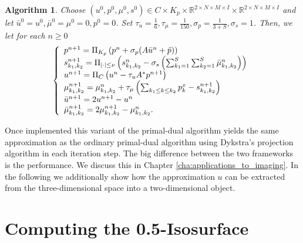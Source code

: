 \documentclass[abstracton]{scrreprt}
\newtheorem{algorithm}[theorem]{Algorithm}
\begin{document}
            \begin{algorithm}
                \label{alg:mumford_shah_lagrange_multiplier}
                Choose $(u^{0}, p^{0}, \mu^{0}, s^{0}) \in C \times K_{p} \times \mathbb{R}^{2 \times N \times M \times I} \times \mathbb{R}^{2 \times N \times M \times I}$ and let $\bar{u}^{0} = u^{0}, \bar{\mu}^{0} = \mu^{0} = 0, p^{0} = 0$. Set $\tau_{u} = \frac{1}{6}, \tau_{\mu} = \frac{1}{150}, \sigma_{p} = \frac{1}{3 + S}, \sigma_{s} = 1$. Then, we let for each $n \ge 0$
                    \begin{equation}
                        \left\{ 
                            \begin{array}{l l}
                              p^{n+1} = \Pi_{K_{p}} \left(p^{n} + \sigma_{p} (A \bar{u}^{n} + \tilde{p})\right) \\
                              s_{k_{1}, k_{2}}^{n+1} = \Pi_{|\cdot| \le \nu} \left(s_{k_{1}, k_{2}}^{n} - \sigma_{s} \left( \sum_{k_{1} = 1}^{S} \sum_{k_{2} = 1}^{S} \bar{\mu}_{k_{1}, k_{2}}^{n} \right) \right) \\
                              u^{n+1} = \Pi_{C} \left(u^{n} - \tau_{u} A^{*} p^{n+1} \right) \\
                              \mu_{k_{1}, k_{2}}^{n+1} = \mu_{k_{1}, k_{2}}^{n} + \tau_{\mu} \left( \sum_{k_{1} \le k \le k_{2}} p^{x}_{k} - s_{k_{1}, k_{2}}^{n+1} \right) \\
                              \bar{u}^{n+1} = 2u^{n+1} - u^{n} \\
                              \bar{\mu}_{k_{1}, k_{2}}^{n+1} = 2\mu_{k_{1}, k_{2}}^{n+1} - \mu_{k_{1}, k_{2}}^{n}.
                            \end{array}
                        \right.
                    \end{equation}
            \end{algorithm}
        Once implemented this variant of the primal-dual algorithm yields the same approximation as the ordinary primal-dual algorithm using Dykstra's projection algorithm in each iteration step. The big difference between the two frameworks is the performance. We discuss this in Chapter \ref{cha:applications_to_imaging}. In the following we additionally show how the approximation $u$ can be extracted from the three-dimensional space into a two-dimensional object.
    \section{Computing the 0.5-Isosurface} %
    \label{sec:computing_the_0_5_isosurface}
\end{document}
